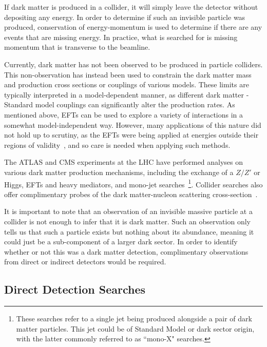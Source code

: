 If dark matter is produced in a collider, it will simply leave the 
detector without depositing any energy. 
In order to determine if such an invisible particle was produced, 
conservation of energy-momentum is used to determine if 
there are any events that are missing energy. In practice, what 
is searched for is missing momentum that is transverse to the beamline.

Currently, dark matter has not been observed to be produced in particle colliders. This non-observation has instead been used to constrain the dark matter mass and production cross sections or couplings of various models. 
These limits are typically interpreted in a model-dependent manner, as different dark matter - Standard model couplings can significantly alter the production rates.
As mentioned above, EFTs can be used to explore a variety of interactions in a somewhat model-independent way.
However, many applications of this nature did not hold up to scrutiny, as the EFTs were being applied at energies outside their regions of validity~\cite{Busoni:2013lha_jan_ValidityEffectiveField, Buchmueller:2013dya_EffectiveFieldTheory, Busoni:2014haa_ValidityEffectiveField, Busoni:2014sya_ValidityEffectiveField}, and so care is needed when applying such methods. 

 The ATLAS and CMS experiments at the LHC have performed analyses on various dark matter production mechanisms, including the exchange of a $Z/Z'$ or Higgs, EFTs and heavy mediators, and mono-jet searches~\cite{CMS:2017jdm_jul_Searchdarkmatter}\footnote{These searches refer to a single jet being produced alongside a pair of dark matter particles. This jet could be of Standard Model or dark sector origin, with the latter commonly referred to as ``mono-X" searches.}. Collider searches also offer complimentary probes of the dark matter-nucleon scattering cross-section~\cite{Ruppin:2014bra_oct_Complementaritydarkmatter}. 
 
 It is important to note that an observation of an invisible massive particle at a collider is not enough to infer that it is dark matter. Such an observation only tells us that such a particle exists but nothing about its abundance, meaning it could just be a sub-component of a larger dark sector. In order to identify whether or not this was a dark matter detection, complimentary observations from direct or indirect detectors would be required. 
 
\subsection{Direct Detection Searches}

